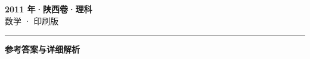 \documentclass[zihao=5, a4paper]{ctexart}
\begin{document}
\begin{center}
  {\Large\bfseries 2011 年·陕西卷·理科}\\[4pt]
  {\large 数学 · 印刷版}
\end{center}
\medskip
{}

\par\bigskip\hrule\bigskip
{}
\begin{center}{\large\bfseries 参考答案与详细解析}\end{center}
\smallskip

\end{document}
